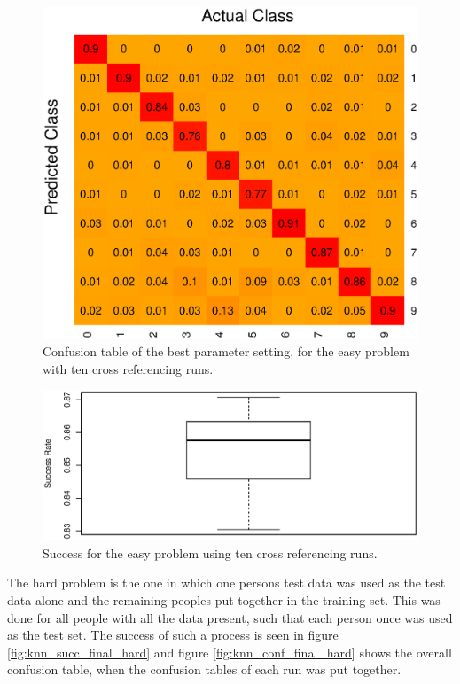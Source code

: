 \begin{figure}[H]
\centering
\includegraphics[width = 0.65 \textwidth]{graphics/knn_confusion_bestparam_easy}
\caption[Confusion table for the easy problem.]{Confusion table of the best parameter setting, for the easy problem with ten cross referencing runs.}
\label{fig:knn_conf_final_easy}
\end{figure}


\begin{figure}[H]
\centering
\includegraphics[width = 0.9 \textwidth]{graphics/knn_final_full_easy}
\caption[Success of K-NN on the easy problem.]{Success for the easy problem using ten cross referencing runs.}
\label{fig:knn_succ_final_easy}
\end{figure}


The hard problem is the one in which one persons test data was used as the test data alone and the remaining peoples put together in the training set.
This was done for all people with all the data present, such that each person once was used as the test set.
The success of such a process is seen in figure \ref{fig:knn_succ_final_hard} and figure \ref{fig:knn_conf_final_hard} shows the overall confusion table, when the confusion tables of each run was put together.


